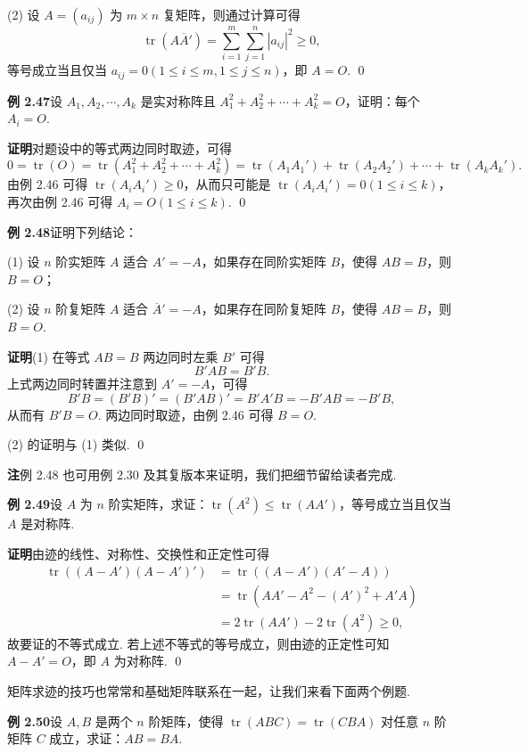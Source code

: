 \documentclass[UTF8,12pt,a4paper,fontset=fandol]{ctexart}
\begin{document}
(2) 设 $A=(a_{ij})$ 为 $m\times n$ 复矩阵，则通过计算可得
\[
\operatorname{tr}(A\overline A')=\sum_{i=1}^m\sum_{j=1}^n |a_{ij}|^2\ge0,
\]
等号成立当且仅当 $a_{ij}=0(1\le i\le m,1\le j\le n)$，即 $A=O$. \qed

\noindent\textbf{例 2.47}\quad 设 $A_1,A_2,\cdots,A_k$ 是实对称阵且 $A_1^2+A_2^2+\cdots+A_k^2=O$，证明：每个 $A_i=O$.

\noindent\textbf{证明}\quad 对题设中的等式两边同时取迹，可得
\[
0=\operatorname{tr}(O)=\operatorname{tr}(A_1^2+A_2^2+\cdots+A_k^2)
=\operatorname{tr}(A_1A_1')+\operatorname{tr}(A_2A_2')+\cdots+\operatorname{tr}(A_kA_k').
\]
由例 2.46 可得 $\operatorname{tr}(A_iA_i')\ge0$，从而只可能是 $\operatorname{tr}(A_iA_i')=0(1\le i\le k)$，再次由例 2.46 可得 $A_i=O(1\le i\le k)$. \qed

\noindent\textbf{例 2.48}\quad 证明下列结论：

(1) 设 $n$ 阶实矩阵 $A$ 适合 $A'=-A$，如果存在同阶实矩阵 $B$，使得 $AB=B$，则 $B=O$；

(2) 设 $n$ 阶复矩阵 $A$ 适合 $\overline A'=-A$，如果存在同阶复矩阵 $B$，使得 $AB=B$，则 $B=O$.

\noindent\textbf{证明}\quad (1) 在等式 $AB=B$ 两边同时左乘 $B'$ 可得
\[
B'AB=B'B.
\]
上式两边同时转置并注意到 $A'=-A$，可得
\[
B'B=(B'B)'=(B'AB)'=B'A'B=-B'AB=-B'B,
\]
从而有 $B'B=O$. 两边同时取迹，由例 2.46 可得 $B=O$.

(2) 的证明与 (1) 类似. \qed

\noindent\textbf{注}\quad 例 2.48 也可用例 2.30 及其复版本来证明，我们把细节留给读者完成.

\noindent\textbf{例 2.49}\quad 设 $A$ 为 $n$ 阶实矩阵，求证：$\operatorname{tr}(A^2)\le \operatorname{tr}(AA')$，等号成立当且仅当 $A$ 是对称阵.

\noindent\textbf{证明}\quad 由迹的线性、对称性、交换性和正定性可得
\[
\begin{aligned}
\operatorname{tr}((A-A')(A-A')')
&=\operatorname{tr}((A-A')(A'-A))\\
&=\operatorname{tr}(AA'-A^2-(A')^2+A'A)\\
&=2\operatorname{tr}(AA')-2\operatorname{tr}(A^2)\ge0,
\end{aligned}
\]
故要证的不等式成立. 若上述不等式的等号成立，则由迹的正定性可知 $A-A'=O$，即 $A$ 为对称阵. \qed

矩阵求迹的技巧也常常和基础矩阵联系在一起，让我们来看下面两个例题.

\noindent\textbf{例 2.50}\quad 设 $A,B$ 是两个 $n$ 阶矩阵，使得 $\operatorname{tr}(ABC)=\operatorname{tr}(CBA)$ 对任意 $n$ 阶矩阵 $C$ 成立，求证：$AB=BA$.
\end{document}
